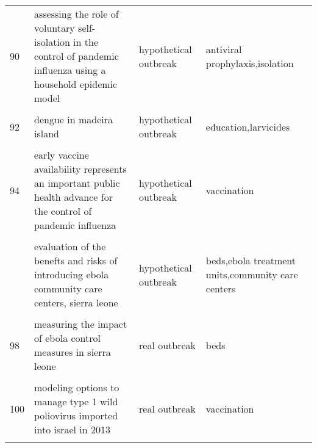 \documentclass[
]{article}
\begin{document}
\begin{landscape}
\begin{longtable}{l>{\raggedright\arraybackslash}p{3cm}l>{\raggedright\arraybackslash}p{8cm}}
90 & assessing the role of voluntary self-isolation in the control of pandemic influenza using a household epidemic model & hypothetical outbreak & antiviral prophylaxis,isolation\\
\addlinespace
\cellcolor{gray!6}{91} & \cellcolor{gray!6}{be-codis: a mathematical model to predict the risk of human diseases spread between countries—validation and application to the 2014–2015 ebola virus disease epidemic} & \cellcolor{gray!6}{real outbreak} & \cellcolor{gray!6}{hygiene,isolation,hospitalization}\\
92 & dengue in madeira island & hypothetical outbreak & education,larvicides\\
\cellcolor{gray!6}{93} & \cellcolor{gray!6}{dynamic simulation of a seiqr-v epidemic model based on cellular automata} & \cellcolor{gray!6}{hypothetical outbreak} & \cellcolor{gray!6}{quarantine,vaccination}\\
94 & early vaccine availability represents an important public health advance for the control of pandemic influenza & hypothetical outbreak & vaccination\\
\cellcolor{gray!6}{95} & \cellcolor{gray!6}{effectiveness of ebola treatment units and community care centers — liberia, september 23–october 31, 2014} & \cellcolor{gray!6}{real outbreak} & \cellcolor{gray!6}{ebola treatment units,community care centers}\\
\addlinespace
96 & evaluation of the benefts and risks of introducing ebola community care centers, sierra leone & hypothetical outbreak & beds,ebola treatment units,community care centers\\
\cellcolor{gray!6}{97} & \cellcolor{gray!6}{evidence for emergency vaccination having played a crucial role to control the 1965/66 foot-and-mouth disease outbreak in switzerland} & \cellcolor{gray!6}{real outbreak} & \cellcolor{gray!6}{contact tracing,culling,travel restriction,vaccination,surveillance}\\
98 & measuring the impact of ebola control measures in sierra leone & real outbreak & beds\\
\cellcolor{gray!6}{99} & \cellcolor{gray!6}{media impact switching surface during an infectious disease outbreak} & \cellcolor{gray!6}{real outbreak} & \cellcolor{gray!6}{media campaign}\\
100 & modeling options to manage type 1 wild poliovirus imported into israel in 2013 & real outbreak & vaccination\\
\addlinespace
\cellcolor{gray!6}{101} & \cellcolor{gray!6}{modeling the effect of comprehensive interventions on ebola virus transmission} & \cellcolor{gray!6}{real outbreak} & \cellcolor{gray!6}{isolation,media campaign,safe burial,vaccination}\\

\end{longtable}
\end{landscape}
\end{document}
